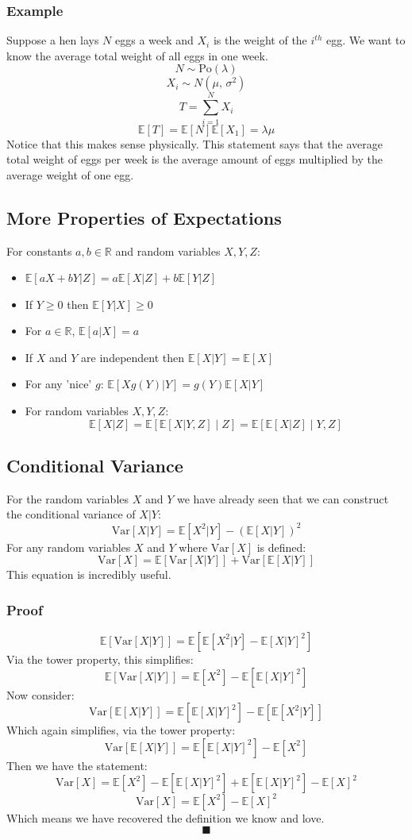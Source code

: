 \documentclass[12pt]{article}
\begin{document}
\subsubsection*{Example}
Suppose a hen lays \(N\) eggs a week and \(X_i\) is the weight of the \(i^{th}\) egg. We want to know the average total weight of all eggs in one week.
\[N\sim \text{Po}(\lambda)\]
\[X_i\sim N(\mu,\,\sigma^2)\]
\[T=\sum^N_{i=1}X_i\]
\[\mathbb{E}[T]=\mathbb{E}[N]\mathbb{E}[X_1]=\lambda\mu\]
Notice that this makes sense physically. This statement says that the average total weight of eggs per week is the average amount of eggs multiplied by the average weight of one egg.
\subsection{More Properties of Expectations}
For constants \(a,b\in\mathbb{R}\) and random variables \(X,Y,Z\):
\begin{itemize}
    \item \(\mathbb{E}[aX+bY|Z]=a\mathbb{E}[X|Z]+b\mathbb{E}[Y|Z]\)
    \item If \(Y\geq 0\) then \(\mathbb{E}[Y|X]\geq 0\)
    \item For \(a\in\mathbb{R}\), \(\mathbb{E}[a|X]=a\)
    \item If \(X\) and \(Y\) are independent then \(\mathbb{E}[X|Y]=\mathbb{E}[X]\)
    \item For any 'nice' \(g\): \(\mathbb{E}[Xg(Y)|Y]=g(Y)\mathbb{E}[X|Y]\)
    \item For random variables \(X,Y,Z\):
    \[\mathbb{E}[X|Z]=\mathbb{E}[\mathbb{E}[X|Y,Z]\mid Z]=\mathbb{E}[\mathbb{E}[X|Z]\mid Y,Z]\]
\end{itemize}
\subsection{Conditional Variance}
For the random variables \(X\) and \(Y\) we have already seen that we can construct the conditional variance of \(X|Y\):
\[\text{Var}[X|Y]=\mathbb{E}[X^2|Y]-(\mathbb{E}[X|Y])^2\]
For any random variables \(X\) and \(Y\) where \(\text{Var}[X]\) is defined:
\[\text{Var}[X]=\mathbb{E}[\text{Var}[X|Y]]+\text{Var}[\mathbb{E}[X|Y]]\]
This equation is incredibly useful.
\subsubsection{Proof}
\[\mathbb{E}[\text{Var}[X|Y]]=\mathbb{E}[\mathbb{E}[X^2|Y]-\mathbb{E}[X|Y]^2]\]
Via the tower property, this simplifies:
\[\mathbb{E}[\text{Var}[X|Y]]=\mathbb{E}[X^2]-\mathbb{E}[\mathbb{E}[X|Y]^2]\]
Now consider:
\[\text{Var}[\mathbb{E}[X|Y]]=\mathbb{E}[\mathbb{E}[X|Y]^2]-\mathbb{E}[\mathbb{E}[X^2|Y]]\]
Which again simplifies, via the tower property:
\[\text{Var}[\mathbb{E}[X|Y]]=\mathbb{E}[\mathbb{E}[X|Y]^2]-\mathbb{E}[X^2]\]
Then we have the statement:
\[\text{Var}[X]=\mathbb{E}[X^2]-\mathbb{E}[\mathbb{E}[X|Y]^2]+\mathbb{E}[\mathbb{E}[X|Y]^2]-\mathbb{E}[X]^2\]
\[\text{Var}[X]=\mathbb{E}[X^2]-\mathbb{E}[X]^2\]
Which means we have recovered the definition we know and love.
\[\blacksquare\]
\clearpage
\end{document}
